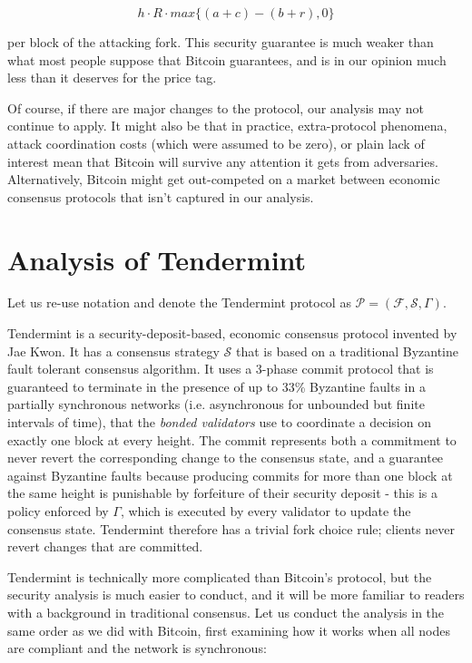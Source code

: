 \documentclass[11pt,a4paper]{article}
\theoremstyle{plain}
\theoremstyle{definition}
\begin{document}
$$h \cdot R \cdot max\{(a + c) - (b + r),0\}$$ 

per block of the attacking fork. This security guarantee is much weaker than what most people suppose that Bitcoin guarantees, and is in our opinion much less than it deserves for the price tag. 

Of course, if there are major changes to the protocol, our analysis may not continue to apply. It might also be that in practice, extra-protocol phenomena, attack coordination costs (which were assumed to be zero), or plain lack of interest mean that Bitcoin will survive any attention it gets from adversaries. Alternatively, Bitcoin might get out-competed on a market between economic consensus protocols that isn't captured in our analysis.

\section{Analysis of Tendermint}

Let us re-use notation and denote the Tendermint protocol as $\mathcal{P} = (\mathcal{F}, \mathcal{S}, \Gamma)$. 

Tendermint is a security-deposit-based, economic consensus protocol invented by Jae Kwon\cite{Tendermint}. It has a consensus strategy $\mathcal{S}$ that is based on a traditional Byzantine fault tolerant consensus algorithm. It uses a 3-phase commit protocol that is guaranteed to terminate in the presence of up to 33\% Byzantine faults in a partially synchronous networks (i.e. asynchronous for unbounded but finite intervals of time), that the \emph{bonded validators} use to coordinate a decision on exactly one block at every height. The commit represents both a commitment to never revert the corresponding change to the consensus state, and a guarantee against Byzantine faults because producing commits for more than one block at the same height is punishable by forfeiture of their security deposit - this is a policy enforced by $\Gamma$, which is executed by every validator to update the consensus state. Tendermint therefore has a trivial fork choice rule; clients never revert changes that are committed.

Tendermint is technically more complicated than Bitcoin's protocol, but the security analysis is much easier to conduct, and it will be more familiar to readers with a background in traditional consensus. Let us conduct the analysis in the same order as we did with Bitcoin, first examining how it works when all nodes are compliant and the network is synchronous:
\end{document}
